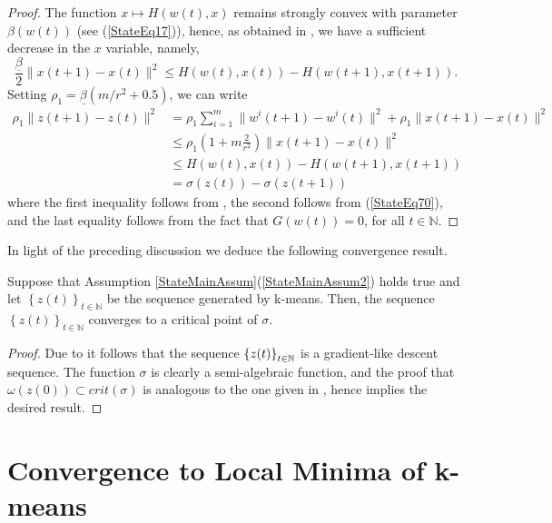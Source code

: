 \begin{proof}
The function $x \mapsto H(w(t),x)$ remains strongly convex with parameter $\beta(w(t))$ (see (\ref{StateEq17})), hence, as obtained in  , we have a sufficient decrease in the $x$ variable, namely,
\begin{equation}
	\frac{\underline{\beta}}{2} \|x(t+1)-x(t)\|^2 \leq H(w(t),x(t)) - H(w(t+1),x(t+1)) . \label{StateEq70}
\end{equation}
Setting $\rho_1 = \underline{\beta} \left(m/r^2 + 0.5\right)$, we can write
\begin{align*}
	\rho_1 \|z(t+1)-z(t)\|^2 &= \rho_1 \sum\limits_{i=1}^{m} \|w^i(t+1)-w^i(t)\|^2 + \rho_1 \|x(t+1)-x(t)\|^2 \\
	&\leq \rho_1 \left(1 + m\frac{2}{r^2}\right) \|x(t+1) - x(t)\|^2 \\
	&\leq H(w(t),x(t)) - H(w(t+1),x(t+1)) \\
	&= \sigma(z(t)) - \sigma(z(t+1))
\end{align*}
where the first inequality follows from , the second follows from (\ref{StateEq70}), and the last equality follows from the fact that $G(w(t))=0$, for all $t \in \mathbb{N}$.
\end{proof}

In light of the preceding discussion we deduce the following convergence result.

\begin{theorem}
Suppose that Assumption \ref{StateMainAssum}(\ref{StateMainAssum2}) holds true and let $\left\lbrace z(t) \right\rbrace_{t \in \mathbb{N}}$ be the sequence generated by k-means. Then, the sequence $\left\lbrace z(t) \right\rbrace_{t \in \mathbb{N}}$ converges to a critical point of $\sigma$.
\end{theorem}

\begin{proof}
Due to  it follows that the sequence $\left\lbrace z(t) \right\rbrace_{t \in \mathbb{N}}$ is a gradient-like descent sequence. The function $\sigma$ is clearly a semi-algebraic function, and the proof that $\omega(z(0)) \subset crit(\sigma)$ is analogous to the one given in , hence  implies the desired result.
\end{proof}

\section{Convergence to Local Minima of k-means}

